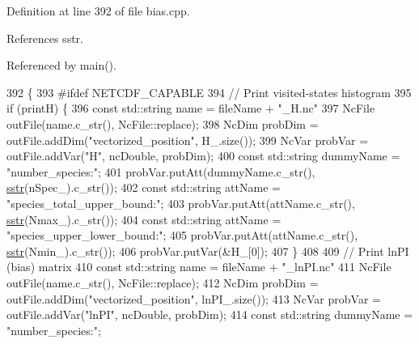 Definition at line 392 of file bias.\+cpp.



References sstr.



Referenced by main().


\begin{DoxyCode}
392                                                        \{
393 \textcolor{preprocessor}{#ifdef NETCDF\_CAPABLE}
394                 \textcolor{comment}{// Print visited-states histogram}
395                 \textcolor{keywordflow}{if} (printH) \{
396                                 \textcolor{keyword}{const} std::string name = fileName + \textcolor{stringliteral}{"\_H.nc"}
397                                 NcFile outFile(name.c\_str(), NcFile::replace);
398                                 NcDim probDim = outFile.addDim(\textcolor{stringliteral}{"vectorized\_position"}, H\_.size());
399                                 NcVar probVar = outFile.addVar(\textcolor{stringliteral}{"H"}, ncDouble, probDim);
400                                 \textcolor{keyword}{const} std::string dummyName = \textcolor{stringliteral}{"number\_species:"};
401                                 probVar.putAtt(dummyName.c\_str(), \hyperlink{utilities_8h_a8feb627efa8e8113cdf95f9a6151a088}{sstr}(nSpec\_).c\_str());
402                                 \textcolor{keyword}{const} std::string attName = \textcolor{stringliteral}{"species\_total\_upper\_bound:"};
403                                 probVar.putAtt(attName.c\_str(), \hyperlink{utilities_8h_a8feb627efa8e8113cdf95f9a6151a088}{sstr}(Nmax\_).c\_str());
404                                 \textcolor{keyword}{const} std::string attName = \textcolor{stringliteral}{"species\_upper\_lower\_bound:"};
405                                 probVar.putAtt(attName.c\_str(), \hyperlink{utilities_8h_a8feb627efa8e8113cdf95f9a6151a088}{sstr}(Nmin\_).c\_str());
406                                 probVar.putVar(&H\_[0]);
407                 \}
408                 
409                 \textcolor{comment}{// Print lnPI (bias) matrix}
410                 \textcolor{keyword}{const} std::string name = fileName + \textcolor{stringliteral}{"\_lnPI.nc"}
411                 NcFile outFile(name.c\_str(), NcFile::replace);
412                 NcDim probDim = outFile.addDim(\textcolor{stringliteral}{"vectorized\_position"}, lnPI\_.size());
413                 NcVar probVar = outFile.addVar(\textcolor{stringliteral}{"lnPI"}, ncDouble, probDim);
414                 \textcolor{keyword}{const} std::string dummyName = \textcolor{stringliteral}{"number\_species:"};

\end{DoxyCode}
